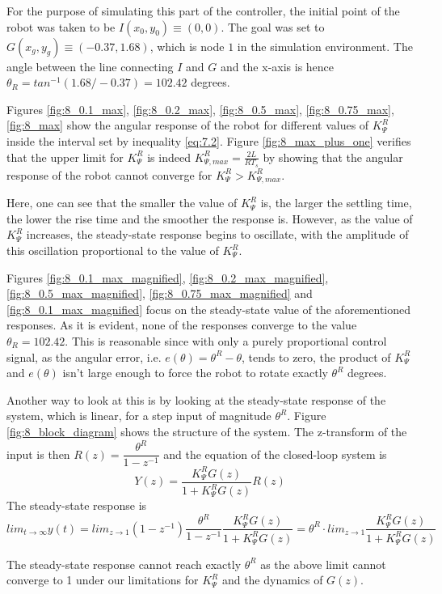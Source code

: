 For the purpose of simulating this part of the controller, the initial point of
the robot was taken to be $I (x_0, y_0) \equiv (0,0)$. The goal was set to
$G (x_g, y_g) \equiv (-0.37, 1.68)$, which is node $1$ in the simulation
environment. The angle between the line connecting $I$ and $G$ and the
x-axis is hence $\theta_R = tan^{-1}(1.68 / -0.37) = 102.42$ degrees.

Figures \ref{fig:8_0.1_max}, \ref{fig:8_0.2_max}, \ref{fig:8_0.5_max},
\ref{fig:8_0.75_max}, \ref{fig:8_max} show the angular response of the robot
for different values of $K_{\Psi}^R$ inside the interval set by inequality
\ref{eq:7.2}. Figure \ref{fig:8_max_plus_one} verifies that the upper limit
for $K_{\Psi}^R$ is indeed $K_{\Psi,max}^R = \frac{2L}{RT_s}$ by showing that the
angular response of the robot cannot converge for $K_{\Psi}^R > K_{\Psi,max}^R$.

Here, one can see that the smaller the value of $K_{\Psi}^R$ is, the larger the
settling time, the lower the rise time and the smoother the response is. However,
as the value of $K_{\Psi}^R$ increases, the steady-state response begins to
oscillate, with the amplitude of this oscillation proportional to the value of
$K_{\Psi}^R$.

Figures \ref{fig:8_0.1_max_magnified}, \ref{fig:8_0.2_max_magnified},
\ref{fig:8_0.5_max_magnified}, \ref{fig:8_0.75_max_magnified} and
\ref{fig:8_0.1_max_magnified} focus on the steady-state value of the
aforementioned responses. As it is evident, none of the responses converge to
the value $\theta_R = 102.42$. This is reasonable since with only a purely
proportional control signal, as the angular error, i.e. $e(\theta) = \theta^R - \theta$,
tends to zero, the product of $K_{\Psi}^R$ and $e(\theta)$ isn't large enough
to force the robot to rotate exactly $\theta^R$ degrees.

Another way to look at this is by looking at the steady-state response of the
system, which is linear, for a step input of magnitude $\theta^R$. Figure
\ref{fig:8_block_diagram} shows the structure of the system. The z-transform of
the input is then $R(z) = \dfrac{\theta^R}{1 - z^{-1}}$ and the equation of the
closed-loop system is
$$Y(z) = \dfrac{K_{\Psi}^R G(z)}{1 + K_{\Psi}^R G(z)} R(z)$$
The steady-state response is
$$lim_{t \to \infty} y(t) = lim_{z \to 1} (1-z^{-1}) \dfrac{\theta^R}{1-z^{-1}}
\dfrac{K_{\Psi}^R G(z)}{1 + K_{\Psi}^R G(z)} = \theta^R \cdot lim_{z \to 1}
\dfrac{K_{\Psi}^R G(z)}{1 + K_{\Psi}^R G(z)}$$

The steady-state response cannot reach exactly $\theta^R$ as the above limit
cannot converge to 1 under our limitations for $K_{\Psi}^R$ and the dynamics of
$G(z)$.

